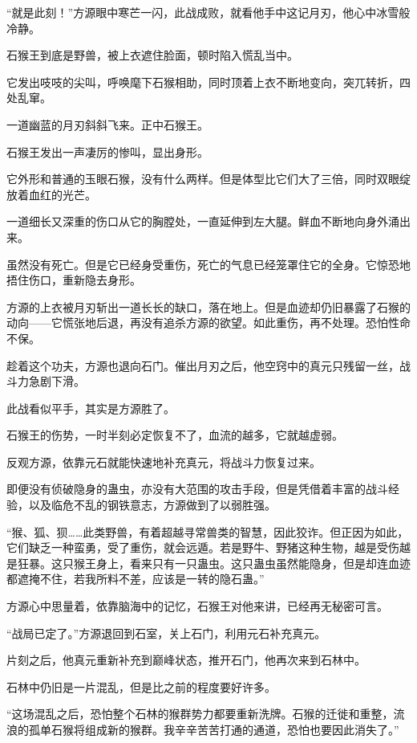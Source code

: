 \begin{this_body}
“就是此刻！”方源眼中寒芒一闪，此战成败，就看他手中这记月刃，他心中冰雪般冷静。

石猴王到底是野兽，被上衣遮住脸面，顿时陷入慌乱当中。

它发出吱吱的尖叫，呼唤麾下石猴相助，同时顶着上衣不断地变向，突兀转折，四处乱窜。

一道幽蓝的月刃斜斜飞来。正中石猴王。

石猴王发出一声凄厉的惨叫，显出身形。

它外形和普通的玉眼石猴，没有什么两样。但是体型比它们大了三倍，同时双眼绽放着血红的光芒。

一道细长又深重的伤口从它的胸膛处，一直延伸到左大腿。鲜血不断地向身外涌出来。

虽然没有死亡。但是它已经身受重伤，死亡的气息已经笼罩住它的全身。它惊恐地捂住伤口，重新隐去身形。

方源的上衣被月刃斩出一道长长的缺口，落在地上。但是血迹却仍旧暴露了石猴的动向——它慌张地后退，再没有追杀方源的欲望。如此重伤，再不处理。恐怕性命不保。

趁着这个功夫，方源也退向石门。催出月刃之后，他空窍中的真元只残留一丝，战斗力急剧下滑。

此战看似平手，其实是方源胜了。

石猴王的伤势，一时半刻必定恢复不了，血流的越多，它就越虚弱。

反观方源，依靠元石就能快速地补充真元，将战斗力恢复过来。

即便没有侦破隐身的蛊虫，亦没有大范围的攻击手段，但是凭借着丰富的战斗经验，以及临危不乱的钢铁意志，方源做到了以弱胜强。

“猴、狐、狈……此类野兽，有着超越寻常兽类的智慧，因此狡诈。但正因为如此，它们缺乏一种蛮勇，受了重伤，就会远遁。若是野牛、野猪这种生物，越是受伤越是狂暴。这只猴王身上，看来只有一只蛊虫。这只蛊虫虽然能隐身，但是却连血迹都遮掩不住，若我所料不差，应该是一转的隐石蛊。”

方源心中思量着，依靠脑海中的记忆，石猴王对他来讲，已经再无秘密可言。

“战局已定了。”方源退回到石室，关上石门，利用元石补充真元。

片刻之后，他真元重新补充到巅峰状态，推开石门，他再次来到石林中。

石林中仍旧是一片混乱，但是比之前的程度要好许多。

“这场混乱之后，恐怕整个石林的猴群势力都要重新洗牌。石猴的迁徙和重整，流浪的孤单石猴将组成新的猴群。我辛辛苦苦打通的通道，恐怕也要因此消失了。”


\end{this_body}
